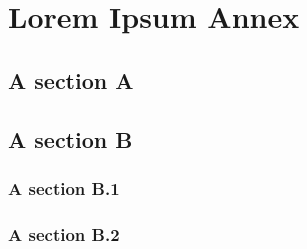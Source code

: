
%


\chapter{Lorem Ipsum Annex}
\label{ann:lorem_ipsum1}

\lipsum[1]

\section{A section A}

\lipsum[2]

\section{A section B}

\lipsum[3]

\subsection{A section B.1}

\lipsum[4]

\subsection{A section B.2}

\lipsum[5]
